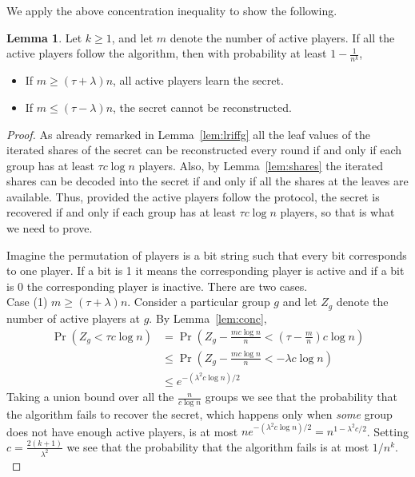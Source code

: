 \documentclass[12pt]{article}
\theoremstyle{definition}
\newtheorem{lemma}[theorem]{Lemma}
\begin{document}
We apply the above concentration inequality to show the following.

\begin{lemma}\label{lem:m}
Let $k\ge 1$, and let $m$ denote the number of active players. If all  
the active players follow the algorithm, 
then with probability at least $1- \frac{1}{n^k}$,
\begin{itemize}
\item If $m \geq (\tau + \lambda)n$, all active players learn the secret.
\item If $m \leq (\tau - \lambda)n$, the secret cannot be reconstructed.
\end{itemize}
\end{lemma}
\begin{proof}
As already remarked in Lemma~\ref{lem:lriffg} all the leaf values of the 
iterated shares of the secret can be reconstructed every round if and only if 
each group has at least $\tau c \log n$ players. Also, by 
Lemma~\ref{lem:shares} the iterated shares can be decoded into the secret
if and only if all the shares at the leaves are available. Thus, provided the  
active players  follow the protocol, the secret is recovered if and only if
each group has at least $\tau c \log n$ players, so that is what we 
need to prove.

Imagine the permutation of players is a bit string such that every bit
corresponds to one player. If a bit is 1 it means the corresponding
player is active and if a bit is 0 the corresponding player is
inactive.  There are two cases.\\

\smallskip
\noindent
Case (1) $m \ge (\tau +\lambda)n$.  Consider a particular group
$g$ and let $Z_g$ denote the number of active players at
$g$. By Lemma~\ref{lem:conc},
\begin{align*}
\Pr(Z_g < \tau c\log n) &= \Pr\left(Z_g -\frac{mc\log n}{n}
< \left(\tau -\frac{m}{n}\right) c\log n\right) 
\\ &\le \Pr\left(
Z_g -\frac{mc\log n}{n} < -\lambda c\log n \right) \\ &\le
e^{-(\lambda^2 c\log n)/2}
\end{align*}
Taking a union bound over all the
$\frac{n}{c\log n}$ groups we see that the probability that the
algorithm fails to recover the secret, which happens only when  
\emph{some} group does not have enough active players, is at most 
$ne^{-(\lambda^2 c\log n)/2} =
n^{1-\lambda^2c/2}$. Setting $c = \frac{2(k+1)}{\lambda^2}$ we see
that the probability that the algorithm fails is at most $1/n^k$.\\


\end{proof}
\end{document}
